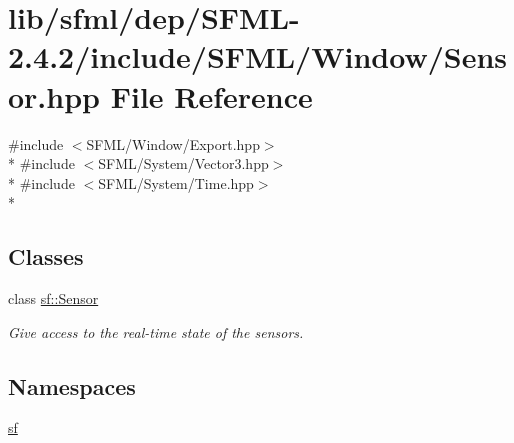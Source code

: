 \hypertarget{sfml_2dep_2_s_f_m_l-2_84_82_2include_2_s_f_m_l_2_window_2_sensor_8hpp}{\section{lib/sfml/dep/\-S\-F\-M\-L-\/2.4.2/include/\-S\-F\-M\-L/\-Window/\-Sensor.hpp File Reference}
\label{sfml_2dep_2_s_f_m_l-2_84_82_2include_2_s_f_m_l_2_window_2_sensor_8hpp}
}
{\ttfamily \#include $<$S\-F\-M\-L/\-Window/\-Export.\-hpp$>$}\\*
{\ttfamily \#include $<$S\-F\-M\-L/\-System/\-Vector3.\-hpp$>$}\\*
{\ttfamily \#include $<$S\-F\-M\-L/\-System/\-Time.\-hpp$>$}\\*
\subsection*{Classes}
\begin{DoxyCompactItemize}
\item 
class \hyperlink{classsf_1_1_sensor}{sf\-::\-Sensor}
\begin{DoxyCompactList}\small\item\em Give access to the real-\/time state of the sensors. \end{DoxyCompactList}\end{DoxyCompactItemize}
\subsection*{Namespaces}
\begin{DoxyCompactItemize}
\item 
\hyperlink{namespacesf}{sf}
\end{DoxyCompactItemize}
